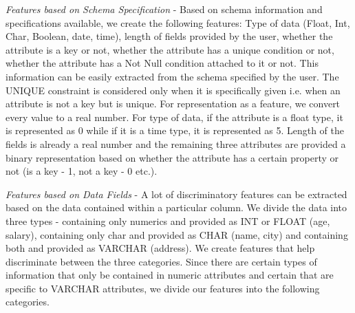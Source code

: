 \documentclass[conference]{IEEEtran}
\begin{document}
\textit{Features based on Schema Specification} - Based on schema information and specifications available, we create the following features: Type of data (Float, Int, Char, Boolean, date, time), length of fields provided by the user, whether the attribute is a key or not, whether the attribute has a unique condition or not, whether the attribute has a Not Null condition attached to it or not. This information can be easily extracted from the schema specified by the user. The UNIQUE constraint is considered only when it is specifically given i.e. when an attribute is not a key but is unique. For representation as a feature, we convert every value to a real number. For type of data, if the attribute is a float type, it is represented as 0 while if it is a time type, it is represented as 5. Length of the fields is already a real number and the remaining three attributes are provided a binary representation based on whether the attribute has a certain property or not (is a key - 1, not a key - 0 etc.).


\textit{Features based on Data Fields} - A lot of discriminatory features can be extracted based on the data contained within a particular column. We divide the data into three types - containing only numerics and provided as INT or FLOAT (age, salary), containing only char and provided as CHAR (name, city) and containing both and provided as VARCHAR (address). We create features that help discriminate between the three categories. Since there are certain types of information that only be contained in numeric attributes and certain that are specific to VARCHAR attributes, we divide our features into the following categories. 
\end{document}

